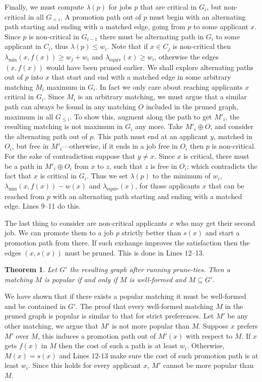 \documentclass[11pt]{article}
\newcommand{\first}{f}
\newcommand{\second}{s}
\newcommand{\minlabel}{\ensuremath{\lambda_{\mathrm{min}}}}
\newcommand{\equivlabel}{\ensuremath{\lambda_{\mathrm{equiv}}}}
\newcommand{\lab}{\ensuremath{\lambda}}
\newtheorem{theorem}{Theorem}
\begin{document}
Finally, we must compute $\lab(p)$ for jobs $p$ that are critical in $G_i$, but non-critical in all $G_{<i}$. A promotion path out of $p$ must begin with an alternating path starting and ending with a matched edge, going from $p$ to some applicant $x$. Since $p$ is non-critical in $G_{i-1}$ there must be alternating path in $G_i$ to some applicant in $C_i$, thus $\lab(p) \leq w_i$. Note that if $x \in C_j$ is non-critical then $\minlabel(x, \first(x) )  \geq w_j + w_i$ and $\equivlabel(x) \geq w_i$, otherwise the edges $(x, \first(x))$ would have been pruned earlier. We shall explore alternating paths out of $p$ into $x$ that start and end with a matched edge in some arbitrary matching $M_i$ maximum in $G_i$. In fact we only care about reaching applicants $x$ critical in $G_i$. Since $M_i$ is an arbitrary matching, we must argue that a similar path can always be found in any matching $O$ included in the pruned graph, maximum in all $G_{\leq i}$. To show this, augment along the path to get $M'_i$, the resulting matching is not maximum in $G_i$ any more. Take $M'_i \oplus O$, and consider the alternating path out of $p$. This path must end at an applicant $y$, matched in $O_i$, but free in $M'_i$---otherwise, if it ends in a job free in $O_i$ then $p$ is non-critical. For the sake of contradiction suppose that $y \neq x$. Since $x$ is critical, there must be a path in $M'_i \oplus O_i$ from $x$ to $z$, such that $z$ is free in $O_i$; which contradicts the fact that $x$ is critical in $G_i$. Thus we set $\lab(p)$ to the minimum of $w_i$, $\minlabel(x, \first(x) ) - w(x)$ and $\equivlabel(x)$, for those applicants $x$ that can be reached from $p$ with an alternating path starting and ending with a matched edge. Lines 9--11 do this.

The last thing to consider are non-critical applicants $x$ who may get their second job. We can promote them to a job $p$ strictly better than $\second(x)$ and start a promotion path from there. If such exchange improves the satisfaction then the edges $(x, \second(x))$ must be pruned. This is done in Lines 12--13.

\begin{theorem} Let $G'$ the resulting graph after running {\sc prune-ties}. Then a matching $M$ is popular if and only if $M$ is well-formed and $M \subseteq G'$.
\end{theorem}

We have shown that if there exists a popular matching it must be well-formed and be contained in $G'$. The proof that every well-formed matching $M$ in the pruned graph is popular is similar to that for strict preferences. Let $M'$ be any other matching, we argue that $M'$ is not more popular than $M$. Suppose $x$ prefers $M'$ over $M$, this induces a promotion path out of $M'(x)$ with respect to $M$. If $x$ gets $f(x)$ in $M$ then the cost of such a path is at least $w_i$. Otherwise, $M(x)=\second(x)$ and Lines 12-13 make sure the cost of such promotion path is at least $w_i$. Since this holds for every applicant $x$, $M'$ cannot be more popular than $M$. 
\end{document}
